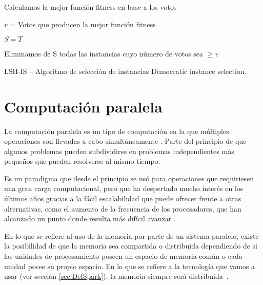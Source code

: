 \begin{algorithm*}
\DontPrintSemicolon
{}

Calculamos la mejor función fitness en base a los votos

$v$ = Votos que producen la mejor función fitness

$S = T$

Eliminamos de S todas las instancias cuyo número de votos sea $\geq v$

\caption{LSH-IS -- Algoritmo de selección de instancias Democratic instance selection. \cite{DemoISPaper}}
\label{alg:DemoIS}
\end{algorithm*}


\section{Computación paralela}\label{sec:CompParalela}

La computación paralela es un tipo de computación en la que múltiples operaciones son llevadas a cabo simultáneamente \cite{Almasi:1989}. Parte del principio de que algunos problemas pueden subdividirse en problemas independientes más pequeños que pueden resolverse al mismo tiempo.

Es un paradigma que desde el principio se usó para operaciones que requiriesen una gran carga computacional, pero que ha despertado mucho interés en los últimos años gracias a la fácil escalabilidad que puede ofrecer frente a otras alternativas, como el aumento de la frecuencia de los procesadores, que han alcanzado un punto donde resulta más difícil avanzar \cite{CompParalelaWiki}.

En lo que se refiere al uso de la memoria por parte de un sistema paralelo, existe la posibilidad de que la memoria sea compartida o distribuida dependiendo de si las unidades de procesamiento poseen un espacio de memoria común o cada unidad posee su propio espacio. En lo que se refiere a la tecnología que vamos a usar (ver sección \ref{sec:DefSpark}), la memoria siempre será distribuida~\cite{SparkPaper}.

